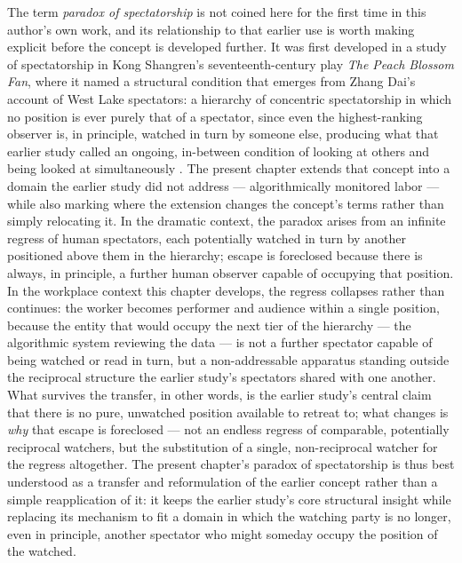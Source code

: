 \documentclass[10pt]{article}
\begin{document}
The term \emph{paradox of spectatorship} is not coined here for the first time in this author's own work, and its relationship to that earlier use is worth making explicit before the concept is developed further. It was first developed in a study of spectatorship in Kong Shangren's seventeenth-century play \emph{The Peach Blossom Fan}, where it named a structural condition that emerges from Zhang Dai's account of West Lake spectators: a hierarchy of concentric spectatorship in which no position is ever purely that of a spectator, since even the highest-ranking observer is, in principle, watched in turn by someone else, producing what that earlier study called an ongoing, in-between condition of looking at others and being looked at simultaneously \cite{zhu2025}. The present chapter extends that concept into a domain the earlier study did not address --- algorithmically monitored labor --- while also marking where the extension changes the concept's terms rather than simply relocating it. In the dramatic context, the paradox arises from an infinite regress of human spectators, each potentially watched in turn by another positioned above them in the hierarchy; escape is foreclosed because there is always, in principle, a further human observer capable of occupying that position. In the workplace context this chapter develops, the regress collapses rather than continues: the worker becomes performer and audience within a single position, because the entity that would occupy the next tier of the hierarchy --- the algorithmic system reviewing the data --- is not a further spectator capable of being watched or read in turn, but a non-addressable apparatus standing outside the reciprocal structure the earlier study's spectators shared with one another. What survives the transfer, in other words, is the earlier study's central claim that there is no pure, unwatched position available to retreat to; what changes is \emph{why} that escape is foreclosed --- not an endless regress of comparable, potentially reciprocal watchers, but the substitution of a single, non-reciprocal watcher for the regress altogether. The present chapter's paradox of spectatorship is thus best understood as a transfer and reformulation of the earlier concept rather than a simple reapplication of it: it keeps the earlier study's core structural insight while replacing its mechanism to fit a domain in which the watching party is no longer, even in principle, another spectator who might someday occupy the position of the watched.
\end{document}
